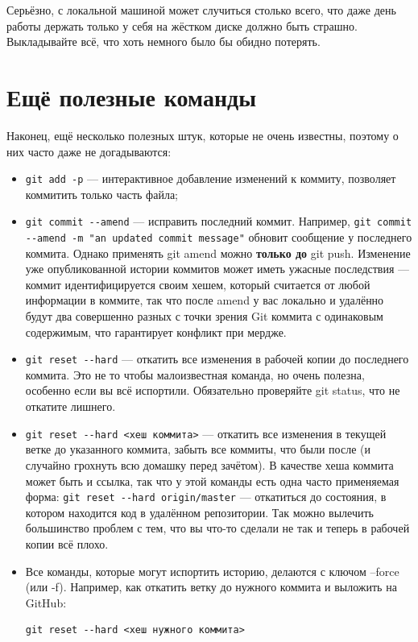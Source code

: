 \documentclass{../../text-style}
\begin{document}
Серьёзно, с локальной машиной может случиться столько всего, что даже день работы держать только у себя на жёстком диске должно быть страшно. Выкладывайте всё, что хоть немного было бы обидно потерять.


\section{Ещё полезные команды}

Наконец, ещё несколько полезных штук, которые не очень известны, поэтому о них часто даже не догадываются:

\begin{itemize}
    \item \verb|git add -p| --- интерактивное добавление изменений к коммиту, позволяет коммитить только часть файла;
    \item \verb|git commit --amend| --- исправить последний коммит. Например, \verb|git commit --amend -m "an updated commit message"| обновит сообщение у последнего коммита. Однако применять git amend можно \textbf{только до} git push. Изменение уже опубликованной истории коммитов может иметь ужасные последствия --- коммит идентифицируется своим хешем, который считается от любой информации в коммите, так что после amend у вас локально и удалённо будут два совершенно разных с точки зрения Git коммита с одинаковым содержимым, что гарантирует конфликт при мердже.
    \item \verb|git reset --hard| --- откатить все изменения в рабочей копии до последнего коммита. Это не то чтобы малоизвестная команда, но очень полезна, особенно если вы всё испортили. Обязательно проверяйте git status, что не откатите лишнего.
    \item \verb|git reset --hard <хеш коммита>| --- откатить все изменения в текущей ветке до указанного коммита, забыть все коммиты, что были после (и случайно грохнуть всю домашку перед зачётом). В качестве хеша коммита может быть и ссылка, так что у этой команды есть одна часто применяемая форма: \verb|git reset --hard origin/master| --- откатиться до состояния, в котором находится код в удалённом репозитории. Так можно вылечить большинство проблем с тем, что вы что-то сделали не так и теперь в рабочей копии всё плохо.
    \item Все команды, которые могут испортить историю, делаются с ключом --force (или -f). Например, как откатить ветку до нужного коммита и выложить на GitHub:
        \begin{verbatim}
git reset --hard <хеш нужного коммита>

\end{verbatim}
\end{itemize}
\end{document}
